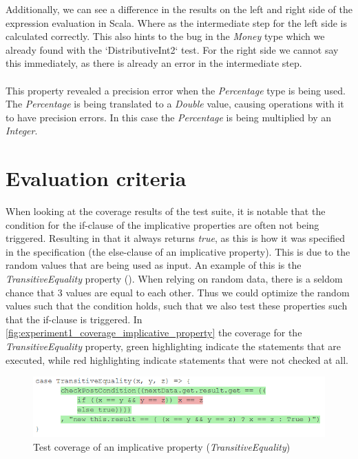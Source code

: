 \FloatBarrier
Additionally, we can see a difference in the results on the left and right side of the expression evaluation in Scala. Where as the intermediate step for the left side is calculated correctly. This also hints to the bug in the \textit{Money} type which we already found with the `DistributiveInt2` test. For the right side we cannot say this immediately, as there is already an error in the intermediate step.\\
\\
This property revealed a precision error when the \textit{Percentage} type is being used. The \textit{Percentage} is being translated to a \textit{Double} value, causing operations with it to have precision errors. In this case the \textit{Percentage} is being multiplied by an \textit{Integer}.

\section{Evaluation criteria}

When looking at the coverage results of the test suite, it is notable that the condition for the if-clause of the implicative properties are often not being triggered.  Resulting in that it always returns \textit{true}, as this is how it was specified in the specification (the else-clause of an implicative property). This is due to the random values that are being used as input. An example of this is the \textit{TransitiveEquality} property (). When relying on random data, there is a seldom chance that 3 values are equal to each other. Thus we could optimize the random values such that the condition holds, such that we also test these properties such that the if-clause is triggered. In \autoref{fig:experiment1_coverage_implicative_property} the coverage for the \textit{TransitiveEquality} property, green highlighting indicate the statements that are executed, while red highlighting indicate statements that were not checked at all.
\FloatBarrier
\begin{figure}[!ht]
	\includegraphics[width=\linewidth]{figures/experiment1_coverage_implicative_property}
\caption{Test coverage of an implicative property (\textit{TransitiveEquality})}
\label{fig:experiment1_coverage_implicative_property}
\centering
\end{figure}
\FloatBarrier

